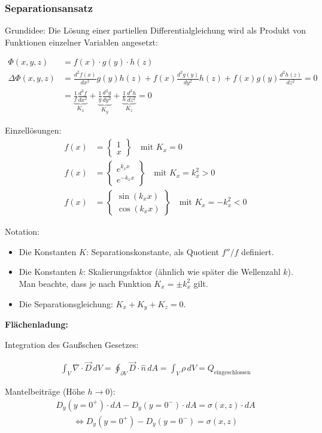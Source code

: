 
\subsubsection{Separationsansatz}
Grundidee: Die Lösung einer partiellen Differentialgleichung wird als Produkt von Funktionen einzelner Variablen angesetzt:

\begin{align}
\Phi(x, y, z) &= f(x) \cdot g(y) \cdot h(z)\\
\Delta\Phi(x, y, z) &= \frac{d^2 f(x)}{dx^2} g(y)h(z) + f(x) \frac{d^2 g(y)}{dy^2} h(z) + f(x)g(y) \frac{d^2h(z)}{dz^2} = 0\\
&= \underbrace{\frac{1}{f} \frac{d^2 f}{dx^2}}_{K_x} +
\underbrace{\frac{1}{g} \frac{d^2 g}{dy^2}}_{K_y} +
\underbrace{\frac{1}{h} \frac{d^2h}{dz^2}}_{K_z} = 0
\end{align}

Einzellösungen:
\begin{align}
f(x) &= \begin{Bmatrix} 1 \\ x \end{Bmatrix} \quad \text{mit } K_x = 0 \tag{3.43}\\
f(x) &= \begin{Bmatrix} e^{k_x x} \\ e^{-k_x x} \end{Bmatrix} \quad \text{mit } K_x = k_x^2 > 0 \tag{3.44}\\
f(x) &= \begin{Bmatrix} \sin(k_x x) \\ \cos(k_x x) \end{Bmatrix} \quad \text{mit } K_x = -k_x^2 < 0 \tag{3.45}
\end{align}


Notation:
\begin{itemize}
    \item Die Konstanten $K$: Separationskonstante, als Quotient $f''/f$ definiert. 
    \item Die Konstanten $k$: Skalierungsfaktor (ähnlich wie später die Wellenzahl $k$). Man beachte, dass je nach Funktion $K_x = \pm k_x^2$ gilt.
    \item Die Separationsgleichung: $K_x + K_y + K_z = 0$.
\end{itemize}


\textbf{Flächenladung:}


Integration des Gaußschen Gesetzes:

\begin{align}
\int_V \nabla \cdot \vec{D} \, dV = \oint_{\partial V} \vec{D} \cdot \hat{n} \, dA = \int_V \rho \, dV = Q_{\text{eingeschlossen}}
\end{align}

Mantelbeiträge (Höhe $h \to 0$):
\begin{align}
D_y(y=0^+) \cdot dA - D_y(y=0^-) \cdot dA = \sigma(x,z) \cdot dA
\end{align}
\begin{align}
\Leftrightarrow D_y(y=0^+) - D_y(y=0^-) = \sigma(x,z)
\end{align}
